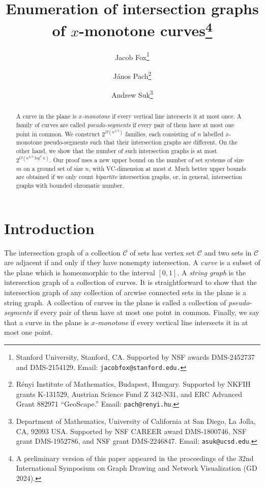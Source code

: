 \documentclass[11pt]{article}
\date{}
\title{Enumeration of intersection graphs of $x$-monotone curves\footnote{A preliminary version of this paper appeared in the proceedings of the 32nd International Symposium on Graph Drawing and Network Visualization (GD 2024).}}
\theoremstyle{plain}
\theoremstyle{definition}
\theoremstyle{remark}
\begin{document}
\author{Jacob Fox\thanks{Stanford University, Stanford, CA. Supported by NSF awards DMS-2452737 and DMS-2154129. Email: {\tt jacobfox@stanford.edu.}} \and J\'anos Pach\thanks{R\'enyi Institute of Mathematics, Budapest, Hungary. Supported by NKFIH grants K-131529, Austrian Science Fund Z 342-N31, and ERC Advanced Grant 882971 ``GeoScape.'' Email:
{\tt pach@renyi.hu}.}\and  Andrew Suk\thanks{Department of Mathematics, University of California at San Diego, La Jolla, CA, 92093 USA. Supported by NSF CAREER award DMS-1800746, NSF grant DMS-1952786, and NSF grant DMS-2246847. Email: {\tt asuk@ucsd.edu}.} }


\maketitle


\begin{abstract}
\noindent A curve in the plane is \emph{$x$-monotone} if every vertical line intersects it at most once. A family of curves are called \emph{pseudo-segments} if every pair of them have at most one point in common. We construct $2^{\Omega(n^{4/3})}$ families, each consisting of $n$ labelled $x$-monotone pseudo-segments such that their intersection graphs are different. On the other hand, we show that the number of such intersection graphs is at most $2^{O(n^{4/3}\log^2n)}$. Our proof uses a new upper bound on the number of set systems of size $m$ on a ground set of size $n$, with VC-dimension at most $d$. Much better upper bounds are obtained if we only count \emph{bipartite} intersection graphs, or, in general, intersection graphs with bounded chromatic number. 

\end{abstract}

\section{Introduction}
The intersection graph of a collection $\mathcal{C}$ of sets has vertex set $\mathcal{C}$ and two sets in $\mathcal{C}$ are adjacent if and
only if they have nonempty intersection. 
 A \emph{curve} is a subset of the plane which is homeomorphic to
the interval $[0, 1]$. A \emph{string graph} is the intersection graph of a collection of curves. It is straightforward
to show that the intersection graph of any collection of arcwise connected sets in the plane is a string graph.  A collection of curves in the plane is called a collection of \emph{pseudo-segments} if every pair of them have
at most one point in common.  Finally, we say that a curve in the plane is \emph{$x$-monotone} if every vertical line intersects it in at most one point.
\end{document}
